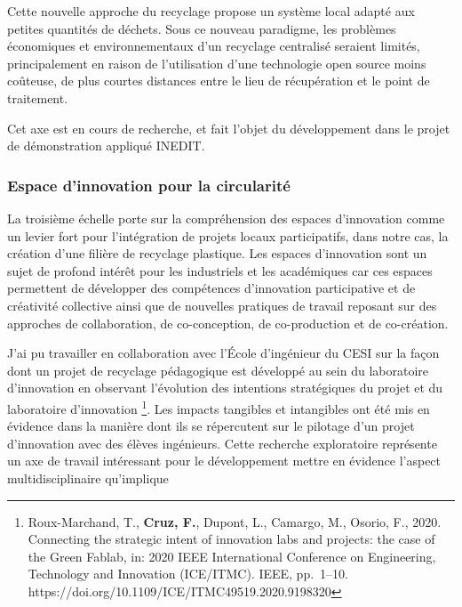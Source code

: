 \documentclass[
  11pt,
]{article}
\begin{document}
Cette nouvelle approche du recyclage propose un système local adapté aux
petites quantités de déchets. Sous ce nouveau paradigme, les problèmes
économiques et environnementaux d'un recyclage centralisé seraient
limités, principalement en raison de l'utilisation d'une technologie
open source moins coûteuse, de plus courtes distances entre le lieu de
récupération et le point de traitement.

Cet axe est en cours de recherche, et fait l'objet du développement dans
le projet de démonstration appliqué INEDIT.

\hypertarget{espace-dinnovation-pour-la-circularituxe9}{%
\subsubsection{Espace d'innovation pour la
circularité}\label{espace-dinnovation-pour-la-circularituxe9}}

La troisième échelle porte sur la compréhension des espaces d'innovation
comme un levier fort pour l'intégration de projets locaux participatifs,
dans notre cas, la création d'une filière de recyclage plastique. Les
espaces d'innovation sont un sujet de profond intérêt pour les
industriels et les académiques car ces espaces permettent de développer
des compétences d'innovation participative et de créativité collective
ainsi que de nouvelles pratiques de travail reposant sur des approches
de collaboration, de co-conception, de co-production et de co-création.

J'ai pu travailler en collaboration avec l'École d'ingénieur du CESI sur
la façon dont un projet de recyclage pédagogique est développé au sein
du laboratoire d'innovation en observant l'évolution des intentions
stratégiques du projet et du laboratoire d'innovation \footnote{Roux-Marchand,
  T., \textbf{Cruz, F.}, Dupont, L., Camargo, M., Osorio, F., 2020.
  Connecting the strategic intent of innovation labs and projects: the
  case of the Green Fablab, in: 2020 IEEE International Conference on
  Engineering, Technology and Innovation (ICE/ITMC). IEEE, pp.~1--10.
  https://doi.org/10.1109/ICE/ITMC49519.2020.9198320}. Les impacts
tangibles et intangibles ont été mis en évidence dans la manière dont
ils se répercutent sur le pilotage d'un projet d'innovation avec des
élèves ingénieurs. Cette recherche exploratoire représente un axe de
travail intéressant pour le développement mettre en évidence l'aspect
multidisciplinaire qu'implique
\end{document}
